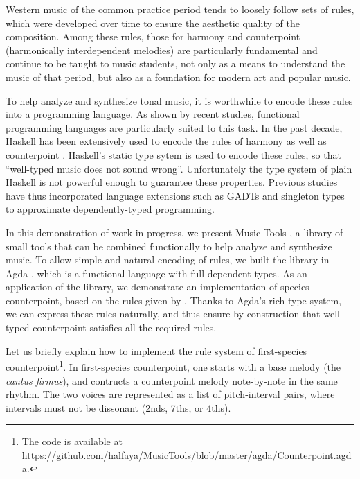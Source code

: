 \documentclass[sigplan,review]{acmart}\settopmatter{printfolios=true,printccs=false,printacmref=false}
\begin{document}
Western music of the common practice period tends to loosely
follow sets of rules, which were developed over time to ensure
the aesthetic quality of the composition. 
Among these rules, those for harmony \citep{piston1987harmony}
and counterpoint (harmonically interdependent
melodies) \citep{fux1965study} are particularly fundamental and continue
to be taught to music students,
not only as a means to understand the music of that period, but
also as a foundation for modern art and popular music.

To help analyze and synthesize tonal music, it is worthwhile to
encode these rules into a programming language. As shown by
recent studies, functional programming languages are particularly
suited to this task.
In the past decade, Haskell has been extensively used to encode
the rules of harmony \citep{fmmh, hihseufha, faamh, hafha, fghm}
as well as counterpoint \citep{szamozvancev2017well}.
Haskell's static type sytem is used to encode these rules, so that
``well-typed music does not sound wrong''.
Unfortunately the type system of plain Haskell
is not powerful enough to guarantee these properties. Previous studies
have thus incorporated language extensions such as GADTs 
\citep{cheney2002lightweight} and singleton types 
\citep{eisenberg2013dependently} to approximate dependently-typed 
programming.

In this demonstration of work in progress, we present Music Tools
\citep{MusicTools}, a library of small tools that can be combined
functionally to help analyze and synthesize music.
To allow simple and natural encoding of rules, we built the library
in Agda \citep{norellphd}, which is a functional language with full
dependent types.
As an application of the library, we demonstrate an implementation of 
species counterpoint, based on the rules given by \citet{fux1965study}.
Thanks to Agda's rich type system, we can express 
these rules naturally, and thus ensure by construction that
well-typed counterpoint satisfies all the required rules.

Let us briefly explain how to implement the rule system of 
first-species counterpoint\footnote{The code is available at
\url{https://github.com/halfaya/MusicTools/blob/master/agda/Counterpoint.agda}.}.
In first-species counterpoint, one starts with a base melody (the \emph{cantus firmus}),
and contructs a counterpoint melody note-by-note in the same rhythm.
The two voices are represented as a list of pitch-interval pairs,
where intervals must not be dissonant (2nds, 7ths, or 4ths).
\end{document}
